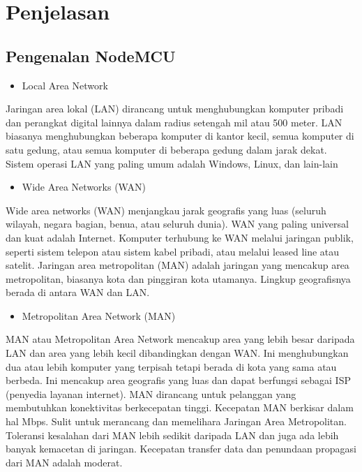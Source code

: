 \documentclass[conference]{IEEEtran}
\begin{document}
\section{Penjelasan}
\subsection{Pengenalan NodeMCU}

\begin{itemize}
    \item Local Area Network
\end{itemize}

Jaringan area lokal (LAN) dirancang untuk menghubungkan komputer pribadi dan perangkat digital lainnya dalam radius setengah mil atau 500 meter. 
LAN biasanya menghubungkan beberapa komputer di kantor kecil, semua komputer di satu gedung, atau semua komputer di beberapa gedung dalam jarak dekat.
Sistem operasi LAN yang paling umum adalah Windows, Linux, dan lain-lain

\begin{itemize}
    \item Wide Area Networks (WAN)
\end{itemize}
Wide area networks (WAN) menjangkau jarak geografis yang luas (seluruh wilayah, negara bagian, benua, atau seluruh dunia). 
WAN yang paling universal dan kuat adalah Internet.
Komputer terhubung ke WAN melalui jaringan publik, seperti sistem telepon atau sistem kabel pribadi, atau melalui leased line atau satelit. 
Jaringan area metropolitan (MAN) adalah jaringan yang mencakup area metropolitan, biasanya kota dan pinggiran kota utamanya. 
Lingkup geografisnya berada di antara WAN dan LAN.

\begin{itemize}
    \item Metropolitan Area Network (MAN)
\end{itemize}
MAN atau Metropolitan Area Network mencakup area yang lebih besar daripada LAN dan area yang lebih kecil dibandingkan dengan WAN.
Ini menghubungkan dua atau lebih komputer yang terpisah tetapi berada di kota yang sama atau berbeda. 
Ini mencakup area geografis yang luas dan dapat berfungsi sebagai ISP (penyedia layanan internet).
MAN dirancang untuk pelanggan yang membutuhkan konektivitas berkecepatan tinggi.
Kecepatan MAN berkisar dalam hal Mbps. Sulit untuk merancang dan memelihara Jaringan Area Metropolitan. 
Toleransi kesalahan dari MAN lebih sedikit daripada LAN dan juga ada lebih banyak kemacetan di jaringan.
Kecepatan transfer data dan penundaan propagasi dari MAN adalah moderat.
\end{document}
